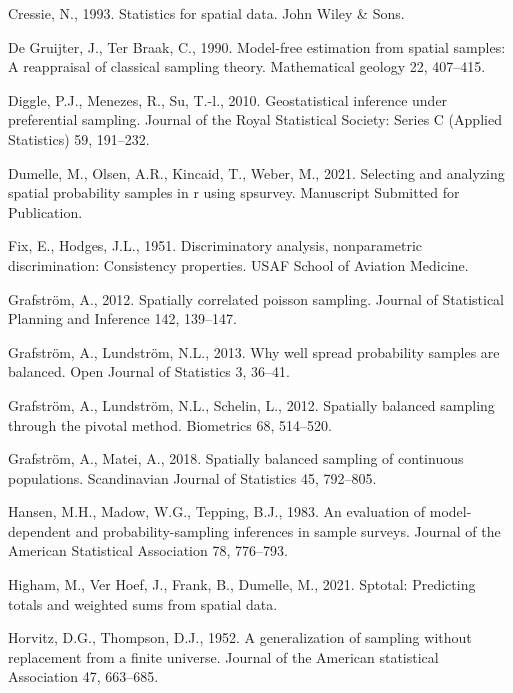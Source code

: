 \documentclass[]{elsarticle} %
\begin{document}
\leavevmode\hypertarget{ref-cressie1993statistics}{}%
Cressie, N., 1993. Statistics for spatial data. John Wiley \& Sons.

\leavevmode\hypertarget{ref-de1990model}{}%
De Gruijter, J., Ter Braak, C., 1990. Model-free estimation from spatial
samples: A reappraisal of classical sampling theory. Mathematical
geology 22, 407--415.

\leavevmode\hypertarget{ref-diggle2010geostatistical}{}%
Diggle, P.J., Menezes, R., Su, T.-l., 2010. Geostatistical inference
under preferential sampling. Journal of the Royal Statistical Society:
Series C (Applied Statistics) 59, 191--232.

\leavevmode\hypertarget{ref-dumelle2021spsurvey}{}%
Dumelle, M., Olsen, A.R., Kincaid, T., Weber, M., 2021. Selecting and
analyzing spatial probability samples in r using spsurvey. Manuscript
Submitted for Publication.

\leavevmode\hypertarget{ref-fix1951discriminatory}{}%
Fix, E., Hodges, J.L., 1951. Discriminatory analysis, nonparametric
discrimination: Consistency properties. USAF School of Aviation
Medicine.

\leavevmode\hypertarget{ref-grafstrom2012spatiallypoisson}{}%
Grafström, A., 2012. Spatially correlated poisson sampling. Journal of
Statistical Planning and Inference 142, 139--147.

\leavevmode\hypertarget{ref-grafstrom2013well}{}%
Grafström, A., Lundström, N.L., 2013. Why well spread probability
samples are balanced. Open Journal of Statistics 3, 36--41.

\leavevmode\hypertarget{ref-grafstrom2012spatially}{}%
Grafström, A., Lundström, N.L., Schelin, L., 2012. Spatially balanced
sampling through the pivotal method. Biometrics 68, 514--520.

\leavevmode\hypertarget{ref-grafstrom2018spatially}{}%
Grafström, A., Matei, A., 2018. Spatially balanced sampling of
continuous populations. Scandinavian Journal of Statistics 45, 792--805.

\leavevmode\hypertarget{ref-hansen1983evaluation}{}%
Hansen, M.H., Madow, W.G., Tepping, B.J., 1983. An evaluation of
model-dependent and probability-sampling inferences in sample surveys.
Journal of the American Statistical Association 78, 776--793.

\leavevmode\hypertarget{ref-higham2021sptotal}{}%
Higham, M., Ver Hoef, J., Frank, B., Dumelle, M., 2021. Sptotal:
Predicting totals and weighted sums from spatial data.

\leavevmode\hypertarget{ref-horvitz1952generalization}{}%
Horvitz, D.G., Thompson, D.J., 1952. A generalization of sampling
without replacement from a finite universe. Journal of the American
statistical Association 47, 663--685.
\end{document}
